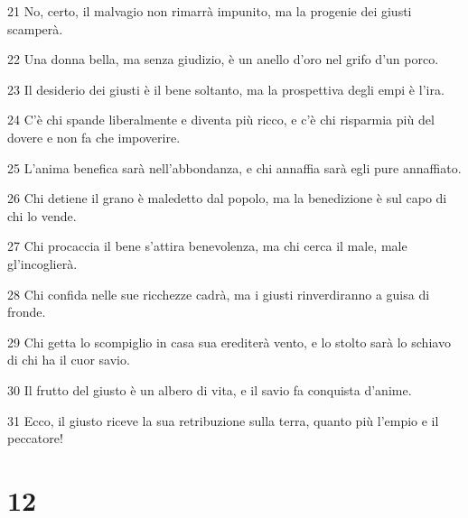 \par 21 No, certo, il malvagio non rimarrà impunito, ma la progenie dei giusti scamperà.
\par 22 Una donna bella, ma senza giudizio, è un anello d'oro nel grifo d'un porco.
\par 23 Il desiderio dei giusti è il bene soltanto, ma la prospettiva degli empi è l'ira.
\par 24 C'è chi spande liberalmente e diventa più ricco, e c'è chi risparmia più del dovere e non fa che impoverire.
\par 25 L'anima benefica sarà nell'abbondanza, e chi annaffia sarà egli pure annaffiato.
\par 26 Chi detiene il grano è maledetto dal popolo, ma la benedizione è sul capo di chi lo vende.
\par 27 Chi procaccia il bene s'attira benevolenza, ma chi cerca il male, male gl'incoglierà.
\par 28 Chi confida nelle sue ricchezze cadrà, ma i giusti rinverdiranno a guisa di fronde.
\par 29 Chi getta lo scompiglio in casa sua erediterà vento, e lo stolto sarà lo schiavo di chi ha il cuor savio.
\par 30 Il frutto del giusto è un albero di vita, e il savio fa conquista d'anime.
\par 31 Ecco, il giusto riceve la sua retribuzione sulla terra, quanto più l'empio e il peccatore!

\chapter{12}

